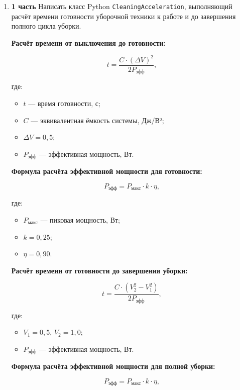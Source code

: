 \begin{enumerate}
\item[27] \textbf{1 часть}  
Написать класс Python \texttt{CleaningAcceleration}, выполняющий расчёт времени готовности уборочной техники к работе и до завершения полного цикла уборки.

\textbf{Расчёт времени от выключения до готовности:}

\begin{equation}
t = \frac{C \cdot (\Delta V)^2}{2P_{\text{эфф}}},
\end{equation}

где:  
\begin{itemize}
    \item $t$ — время готовности, с;  
    \item $C$ — эквивалентная ёмкость системы, Дж/В²;  
    \item $\Delta V = 0{,}5$;  
    \item $P_{\text{эфф}}$ — эффективная мощность, Вт.  
\end{itemize}

\textbf{Формула расчёта эффективной мощности для готовности:}

\begin{equation}
P_{\text{эфф}} = P_{\text{макс}} \cdot k \cdot \eta,
\end{equation}

где:  
\begin{itemize}
    \item $P_{\text{макс}}$ — пиковая мощность, Вт;  
    \item $k = 0{,}25$;  
    \item $\eta = 0{,}90$.  
\end{itemize}

\textbf{Расчёт времени от готовности до завершения уборки:}

\begin{equation}
t = \frac{C \cdot (V_2^2 - V_1^2)}{2P_{\text{эфф}}},
\end{equation}

где:  
\begin{itemize}
    \item $V_1 = 0{,}5$, $V_2 = 1{,}0$;  
    \item $P_{\text{эфф}}$ — эффективная мощность, Вт.  
\end{itemize}

\textbf{Формула расчёта эффективной мощности для полной уборки:}

\begin{equation}
P_{\text{эфф}} = P_{\text{макс}} \cdot k \cdot \eta,
\end{equation}


\end{enumerate}
